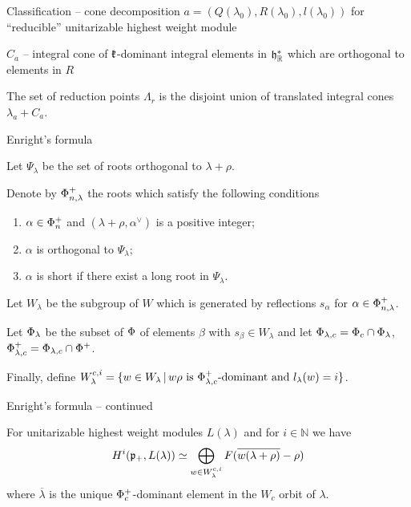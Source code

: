 \documentclass[10pt]{beamer}
\begin{document}
\begin{frame}{Classification -- cone decomposition}
$a=(Q(\lambda_0), R(\lambda_0), l(\lambda_0))$ for ``reducible'' unitarizable highest weight module

$C_a$  -- integral cone of $\mathfrak{k}$-dominant integral elements in $\mathfrak{h}^*_{\mathbb{R}}$ which are orthogonal to elements in $R$

The set of reduction points $\Lambda_r$ is the disjoint union of translated integral cones $\lambda_a + C_a$.
\end{frame}


\begin{frame}{Enright's formula}

\begin{definition}\label{def:cohomology_roots}
Let $\Psi_\lambda$ be the set of roots orthogonal to $\lambda+\rho$.

\pause

 Denote by $\Phi_{n,\lambda}^+$ the roots which satisfy the following conditions
 \begin{enumerate}
    \item $\alpha \in \Phi_n^+$ and $(\lambda+\rho,\alpha^\vee)$ is a positive integer;
    \item $\alpha$ is orthogonal to $\Psi_\lambda$;
    \item $\alpha$ is short if there exist a long root in $\Psi_\lambda$.
 \end{enumerate}

\pause 

 Let $W_\lambda$ be the subgroup of $W$ which is generated by reflections $s_\alpha$ for $\alpha\in \Phi_{n,\lambda}^+$.

\pause 

 Let $\Phi_\lambda$ be the subset of $\Phi$ of elements $\beta$ with $s_\beta\in W_\lambda$ and let $\Phi_{\lambda,c} = \Phi_c \cap \Phi_\lambda$, $\Phi_{\lambda,c}^+ = \Phi_{\lambda,c} \cap \Phi^+$.

\pause 

 Finally, define  $W^{c,i}_\lambda = \{ w \in W_\lambda \, |\, w \rho \text{ is } \Phi^+_{\lambda, c}\text{-dominant and } l_\lambda(w)=i \}$.
\end{definition}

\end{frame}

\begin{frame}{Enright's formula -- continued}
\begin{theorem}
 For unitarizable highest weight modules $L(\lambda)$ and for $i\in \mathbb{N}$ we have
\begin{equation*}
 H^i(\mathfrak{p}_+, L(\lambda))\simeq \bigoplus_{w\in W^{c,i}_\lambda} F(\overline{w(\lambda+\rho)} - \rho)
\end{equation*}
where  $\overline{\lambda}$ is the unique $\Phi_c^+$-dominant element in the $W_c$ orbit of $\lambda$.
\end{theorem}

\end{frame}
\end{document}
